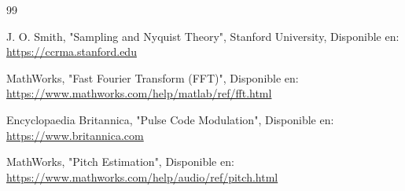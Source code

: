 \documentclass[12pt]{article}
\begin{document}
\begin{thebibliography}{99}
\sloppy

J. O. Smith,
"Sampling and Nyquist Theory",
Stanford University,
Disponible en:
\url{https://ccrma.stanford.edu}

MathWorks,
"Fast Fourier Transform (FFT)",
Disponible en:
\url{https://www.mathworks.com/help/matlab/ref/fft.html}

Encyclopaedia Britannica,
"Pulse Code Modulation",
Disponible en:
\url{https://www.britannica.com}

MathWorks,
"Pitch Estimation",
Disponible en:
\url{https://www.mathworks.com/help/audio/ref/pitch.html}

\end{thebibliography}
\end{document}
